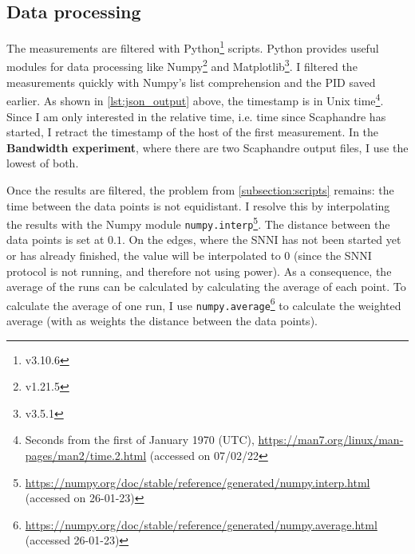 \documentclass[../thesis.tex]{subfiles}
\begin{document}
\subsection{Data processing}
The measurements are filtered with Python\footnote{v3.10.6} scripts. Python provides useful modules for data processing like Numpy\footnote{v1.21.5} and Matplotlib\footnote{v3.5.1}. I filtered the measurements quickly with Numpy's list comprehension and the PID saved earlier. As shown in \autoref{lst:json_output} above, the timestamp is in Unix time\footnote{Seconds from the first of January 1970 (UTC), \url{https://man7.org/linux/man-pages/man2/time.2.html} (accessed on 07/02/22}. Since I am only interested in the relative time, i.e. time since Scaphandre has started, I retract the timestamp of the host of the first measurement. In the \textbf{Bandwidth experiment}, where there are two Scaphandre output files, I use the lowest of both. 

Once the results are filtered, the problem from \autoref{subsection:scripts} remains: the time between the data points is not equidistant. I resolve this by interpolating the results with the Numpy module \verb|numpy.interp|\footnote{\url{https://numpy.org/doc/stable/reference/generated/numpy.interp.html} (accessed on 26-01-23)}. The distance between the data points is set at $0.1$. On the edges, where the SNNI has not been started yet or has already finished, the value will be interpolated to 0 (since the SNNI protocol is not running, and therefore not using power). As a consequence, the average of the runs can be calculated by calculating the average of each point. To calculate the average of one run, I use \verb|numpy.average|\footnote{\url{https://numpy.org/doc/stable/reference/generated/numpy.average.html} (accessed 26-01-23)} to calculate the weighted average (with as weights the distance between the data points). 
\end{document}
